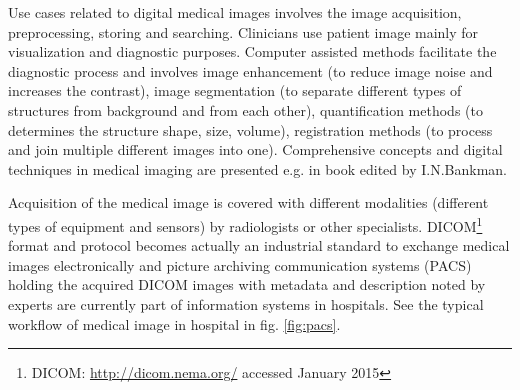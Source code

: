 



Use cases related to digital medical images involves the image acquisition, preprocessing, storing and searching.
Clinicians use patient image mainly for visualization and diagnostic purposes. Computer assisted methods facilitate the diagnostic process and involves image enhancement (to reduce image noise and increases the contrast), image segmentation (to separate different types of structures from background and from each other), quantification methods (to determines the structure shape, size, volume), registration methods (to process and join multiple different images into one).
Comprehensive concepts and digital techniques in medical imaging are presented e.g. in book edited by I.N.Bankman\cite{Bankman2000}.

Acquisition of the medical image is covered with different modalities (different types of equipment and sensors) by radiologists or other specialists. DICOM\footnote{DICOM: \url{http://dicom.nema.org/} accessed January 2015} format and protocol becomes actually an industrial standard to exchange medical images electronically and picture archiving communication systems (PACS) holding the acquired DICOM images with metadata and description noted by experts are currently part of information systems in hospitals. See the typical workflow of medical image in hospital in fig. \ref{fig:pacs}.

